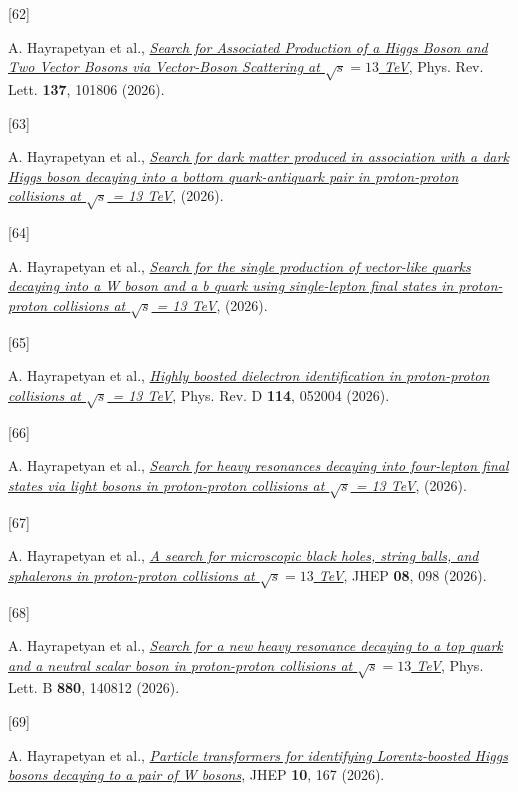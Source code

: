 \documentclass[
]{article}
\newlength{\cslhangindent}
\newlength{\csllabelwidth}
\newenvironment{CSLReferences}[2] %
 {\begin{list}{}{%
  \setlength{\itemindent}{0pt}
  \setlength{\leftmargin}{0pt}
  \setlength{\parsep}{0pt}
  \ifodd #1
   \setlength{\leftmargin}{\cslhangindent}
   \setlength{\itemindent}{-1\cslhangindent}
  \fi
  \setlength{\itemsep}{#2\baselineskip}}}
 {\end{list}}
\newcommand{\CSLLeftMargin}[1]{\parbox[t]{\csllabelwidth}{\strut#1\strut}}
\newcommand{\CSLRightInline}[1]{\parbox[t]{\linewidth - \csllabelwidth}{\strut#1\strut}}
\begin{document}
\begin{CSLReferences}{0}{0}
\CSLLeftMargin{{[}62{]} }%
\CSLRightInline{A. Hayrapetyan et al.,
\emph{\href{https://doi.org/10.1103/gwj9-5bxm}{{Search for Associated
Production of a Higgs Boson and Two Vector Bosons via Vector-Boson
Scattering at \(\sqrt{s}=13\) TeV}}}, Phys. Rev. Lett. \textbf{137},
101806 (2026).}

\CSLLeftMargin{{[}63{]} }%
\CSLRightInline{A. Hayrapetyan et al.,
\emph{\href{https://arxiv.org/abs/2604.20999}{{Search for dark matter
produced in association with a dark Higgs boson decaying into a bottom
quark-antiquark pair in proton-proton collisions at \(\sqrt{s}\) = 13
TeV}}}, (2026).}

\CSLLeftMargin{{[}64{]} }%
\CSLRightInline{A. Hayrapetyan et al.,
\emph{\href{https://arxiv.org/abs/2604.17564}{{Search for the single
production of vector-like quarks decaying into a W boson and a b quark
using single-lepton final states in proton-proton collisions at
\(\sqrt{s}\) = 13 TeV}}}, (2026).}

\CSLLeftMargin{{[}65{]} }%
\CSLRightInline{A. Hayrapetyan et al.,
\emph{\href{https://doi.org/10.1103/hb72-vjj6}{{Highly boosted
dielectron identification in proton-proton collisions at \(\sqrt{s}\) =
13 TeV}}}, Phys. Rev. D \textbf{114}, 052004 (2026).}

\CSLLeftMargin{{[}66{]} }%
\CSLRightInline{A. Hayrapetyan et al.,
\emph{\href{https://arxiv.org/abs/2604.14236}{{Search for heavy
resonances decaying into four-lepton final states via light bosons in
proton-proton collisions at \(\sqrt{s}\) = 13 TeV}}}, (2026).}

\CSLLeftMargin{{[}67{]} }%
\CSLRightInline{A. Hayrapetyan et al.,
\emph{\href{https://doi.org/10.1007/JHEP08(2026)098}{{A search for
microscopic black holes, string balls, and sphalerons in proton-proton
collisions at \(\sqrt{s}=13\) TeV}}}, JHEP \textbf{08}, 098 (2026).}

\CSLLeftMargin{{[}68{]} }%
\CSLRightInline{A. Hayrapetyan et al.,
\emph{\href{https://doi.org/10.1016/j.physletb.2026.140812}{{Search for
a new heavy resonance decaying to a top quark and a neutral scalar boson
in proton-proton collisions at \(\sqrt{s}=13\) TeV}}}, Phys. Lett. B
\textbf{880}, 140812 (2026).}

\CSLLeftMargin{{[}69{]} }%
\CSLRightInline{A. Hayrapetyan et al.,
\emph{\href{https://doi.org/10.1007/JHEP10(2026)167}{{Particle
transformers for identifying Lorentz-boosted Higgs bosons decaying to a
pair of W bosons}}}, JHEP \textbf{10}, 167 (2026).}


\end{CSLReferences}
\end{document}
